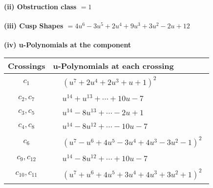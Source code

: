 \documentclass[1p]{elsarticle_modified}
\theoremstyle{definition}
\begin{document}
\flushleft \textbf{(ii) Obstruction class $= 1$}\\~\\
\flushleft \textbf{(iii) Cusp Shapes $= 4 u^6-3 u^5+2 u^4+9 u^3+3 u^2-2 u+12$}\\~\\
\newpage\renewcommand{\arraystretch}{1}
\flushleft \textbf{(iv) u-Polynomials at the component}\newline \\
\begin{tabular}{m{50pt}|m{274pt}}
Crossings & \hspace{64pt}u-Polynomials at each crossing \\
\hline $$\begin{aligned}c_{1}\end{aligned}$$&$\begin{aligned}
&(u^7+2 u^4+2 u^3+u+1)^2
\end{aligned}$\\
\hline $$\begin{aligned}c_{2},c_{7}\end{aligned}$$&$\begin{aligned}
&u^{14}+u^{13}+\cdots+10 u-7
\end{aligned}$\\
\hline $$\begin{aligned}c_{3},c_{5}\end{aligned}$$&$\begin{aligned}
&u^{14}-8 u^{13}+\cdots-2 u+1
\end{aligned}$\\
\hline $$\begin{aligned}c_{4},c_{8}\end{aligned}$$&$\begin{aligned}
&u^{14}-8 u^{12}+\cdots-10 u-7
\end{aligned}$\\
\hline $$\begin{aligned}c_{6}\end{aligned}$$&$\begin{aligned}
&(u^7- u^6+4 u^5-3 u^4+4 u^3-3 u^2-1)^2
\end{aligned}$\\
\hline $$\begin{aligned}c_{9},c_{12}\end{aligned}$$&$\begin{aligned}
&u^{14}-8 u^{12}+\cdots+10 u-7
\end{aligned}$\\
\hline $$\begin{aligned}c_{10},c_{11}\end{aligned}$$&$\begin{aligned}
&(u^7+u^6+4 u^5+3 u^4+4 u^3+3 u^2+1)^2
\end{aligned}$\\
\hline
\end{tabular}\\~\\
\end{document}
